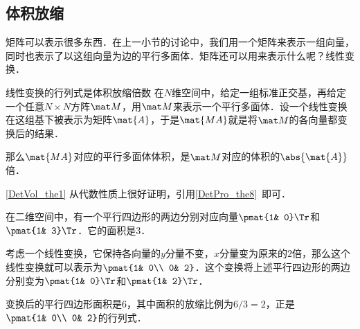 


\subsection{体积放缩}

矩阵可以表示很多东西．在上一小节的讨论中，我们用一个矩阵来表示一组向量，同时也表示了以这组向量为边的平行多面体．矩阵还可以用来表示什么呢？线性变换．

\begin{theorem}{线性变换的行列式是体积放缩倍数}\label{DetVol_the1}
在$N$维空间中，给定一组标准正交基，再给定一个任意$N\times N$方阵$\mat M$，用$\mat M$来表示一个平行多面体．设一个线性变换在这组基下被表示为矩阵$\mat{A}$，于是$\mat{MA}$就是将$\mat M$的各向量都变换后的结果．

那么$\mat{MA}$对应的平行多面体体积，是$\mat M$对应的体积的$\abs{\mat{A}}$倍．
\end{theorem}

\autoref{DetVol_the1} 从代数性质上很好证明，引用\autoref{DetPro_the8}~即可．

\begin{example}{}
在二维空间中，有一个平行四边形的两边分别对应向量$\pmat{1& 0}\Tr$和$\pmat{1& 3}\Tr$．它的面积是$3$．

考虑一个线性变换，它保持各向量的$y$分量不变，$x$分量变为原来的$2$倍，那么这个线性变换就可以表示为$\pmat{1& 0\\ 0& 2}$．这个变换将上述平行四边形的两边分别变为$\pmat{1& 0}\Tr$和$\pmat{1& 2}\Tr$．

变换后的平行四边形面积是$6$，其中面积的放缩比例为$6/3=2$，正是$\pmat{1& 0\\ 0& 2}$的行列式．
\end{example}

























